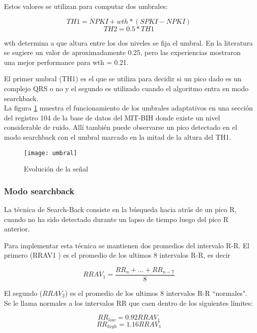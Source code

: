 \documentclass[%
        final,
        notitlepage,
        narroweqnarray,
        inline,
        ]{ieee}
\numberwithin{equation}{section}
\numberwithin{figure}{section}
\numberwithin{table}{section}
\begin{document}
Estos valores se utilizan para computar dos umbrales:

\begin{equation}
TH1 = NPKI + wth*(SPKI - NPKI)
\end{equation}
\begin{equation}
TH2 = 0.5*TH1
\end{equation}

wth determina a que altura entre los dos niveles se fija el umbral. En la literatura
se sugiere un valor de aproximadamente 0.25, pero las experiencias mostraron una mejor
performance para wth = 0.21. 

El primer umbral (TH1) es el que se utiliza para decidir si un pico dado es un complejo QRS o no y el segundo es utilizado cuando el algoritmo entra en modo searchback.\\

La figura \ref{fig:umbral} muestra el funcionamiento de los umbrales adaptativos en una sección del
registro 104 de la base de datos del MIT-BIH donde existe un nivel considerable de
ruido. Allí también puede observarse un pico detectado en el modo searchback con el umbral marcado en la mitad de la altura del TH1.

\begin{figure}
	\centering
	\texttt{[image: umbral]}
	\caption{Evolución de la señal}
	\label{fig:umbral}
\end{figure}

\subsubsection{Modo searchback}\label{sec:searchback}

La técnica de Search-Back consiste en la búsqueda hacia atrás de un pico R, cuando
no ha sido detectado durante un lapso de tiempo luego del pico R anterior.

Para implementar esta técnica se mantienen dos promedios del intervalo R-R. El primero
(RRAV1 ) es el promedio de los ultimos 8 intervalos R-R, es decir

\begin{equation}
RRAV_1=\frac{RR_n+...+RR_{n-7}}{8}
\end{equation}

El segundo ($RRAV_2$) es el promedio de los ultimos 8 intervalos R-R ``normales". Se le llama
normales a los intervalos RR que caen dentro de los siguientes límites:

$$RR_{low}=0.92RRAV_1$$
$$RR_{high}=1.16RRAV_1$$
\end{document}
